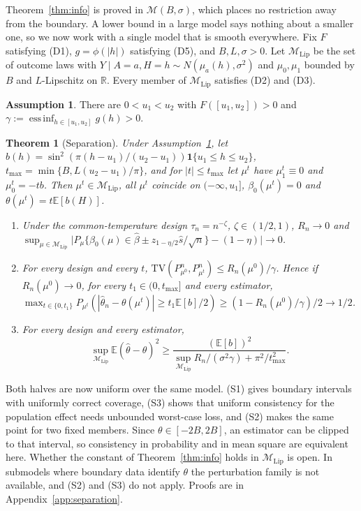 \documentclass[12pt]{article}
\newtheorem{theorem}{Theorem}
\theoremstyle{definition}
\newtheorem{assumption}{Assumption}
\theoremstyle{remark}
\newcommand{\E}{\mathbb{E}}
\newcommand{\M}{\mathcal{M}}
\newcommand{\Mlip}{\mathcal{M}_{\mathrm{Lip}}}
\newcommand{\TV}{\mathrm{TV}}
\DeclareMathOperator*{\essinf}{ess\,inf}
\begin{document}
Theorem~\ref{thm:info} is proved in $\M(B,\sigma)$, which places no restriction
away from the boundary. A lower bound in a large model says nothing about a smaller
one, so we now work with a single model that is smooth everywhere. Fix $F$ satisfying
(D1), $g=\phi(|h|)$ satisfying (D5), and $B,L,\sigma>0$. Let $\Mlip$ be the set of
outcome laws with $Y\mid A=a,H=h\sim N(\mu_a(h),\sigma^2)$ and $\mu_0,\mu_1$ bounded
by $B$ and $L$-Lipschitz on $\mathbb R$. Every member of $\Mlip$ satisfies (D2)
and (D3).

\begin{assumption}\label{ass:SA}
There are $0<u_1<u_2$ with $F([u_1,u_2])>0$ and
$\gamma:=\essinf_{h\in[u_1,u_2]}g(h)>0$.
\end{assumption}

\begin{theorem}[Separation]\label{thm:separation}
Under Assumption~\ref{ass:SA}, let
$b(h)=\sin^2(\pi(h-u_1)/(u_2-u_1))\mathbf 1\{u_1\le h\le u_2\}$,
$t_{\max}=\min\{B,L(u_2-u_1)/\pi\}$, and for $|t|\le t_{\max}$ let $\mu^t$ have
$\mu^t_1\equiv0$ and $\mu^t_0=-tb$. Then $\mu^t\in\Mlip$, all $\mu^t$ coincide on
$(-\infty,u_1]$, $\beta_0(\mu^t)=0$ and $\theta(\mu^t)=t\E[b(H)]$.
\begin{enumerate}[label=(S\arabic*),leftmargin=3em,itemsep=2pt]
\item Under the common-temperature design $\tau_n=n^{-\zeta}$, $\zeta\in(1/2,1)$,
$R_n\to0$ and
$\sup_{\mu\in\Mlip}\big|P_\mu\{\beta_0(\mu)\in\hat\beta\pm z_{1-\eta/2}\hat s/\sqrt n\}-(1-\eta)\big|\to0$.
\item For every design and every $t$,
$\TV(P^n_{\mu^0},P^n_{\mu^t})\le R_n(\mu^0)/\gamma$. Hence if $R_n(\mu^0)\to0$,
for every $t_1\in(0,t_{\max}]$ and every estimator,
$\max_{t\in\{0,t_1\}}P_{\mu^t}(|\hat\theta_n-\theta(\mu^t)|\ge t_1\E[b]/2)\ge
(1-R_n(\mu^0)/\gamma)/2\to1/2$.
\item For every design and every estimator,
\[
\sup_{\Mlip}\E(\hat\theta-\theta)^2\ge\frac{(\E[b])^2}{\sup_{\Mlip}R_n/(\sigma^2\gamma)+\pi^2/t_{\max}^2}.
\]
\end{enumerate}
\end{theorem}

Both halves are now uniform over the same model. (S1) gives boundary intervals with
uniformly correct coverage, (S3) shows that uniform consistency for the population
effect needs unbounded worst-case loss, and (S2) makes the same point for two fixed
members. Since $\theta\in[-2B,2B]$, an estimator can be clipped to that interval, so
consistency in probability and in mean square are equivalent here. Whether the
constant of Theorem~\ref{thm:info} holds in $\Mlip$ is open. In submodels where
boundary data identify $\theta$ the perturbation family is not available, and (S2)
and (S3) do not apply. Proofs are in Appendix~\ref{app:separation}.
\end{document}
